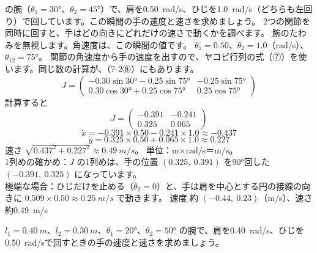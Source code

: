 \begin{phreidai}[関節を回したときの手の速さ]\label{ph:力-7:ex8}
の腕（$\theta_1=\ang{30}$、$\theta_2=\ang{45}$）で、肩を\qty{0.50}{rad/s}、ひじを\qty{1.0}{rad/s}（どちらも左回り）で回しています。この瞬間の手の速度と速さを求めましょう。
\phbamen
2つの関節を同時に回すと、手はどの向きにどれだけの速さで動くかを調べます。
\phmushi
腕のたわみを無視します。角速度は、この瞬間の値です。
\phzu
$\dot\theta_1=0.50$、$\dot\theta_2=1.0$（rad/s）、$\theta_{12}=\ang{75}$。
\phriyu
関節の角速度から手の速度を出すので、ヤコビ行列の式（⑦）を使います。同じ数の計算が、（7-2⑧）にもあります。
\phtateru
\[J=\begin{pmatrix}-0.30\sin\ang{30}-0.25\sin\ang{75}&-0.25\sin\ang{75}\\0.30\cos\ang{30}+0.25\cos\ang{75}&0.25\cos\ang{75}\end{pmatrix}\]
計算すると\[J=\begin{pmatrix}-0.391&-0.241\\0.325&0.065\end{pmatrix}\]
\phtoku
\[\dot x=-0.391\times0.50-0.241\times1.0\approx-0.437\]
\[\dot y=0.325\times0.50+0.065\times1.0\approx0.227\]
速さ $\sqrt{0.437^2+0.227^2}\approx\qty{0.49}{m/s}$。
\phtashikame
単位：m×rad/s＝m/s。\\
1列めの確かめ：$J$ の1列めは、手の位置 $(0.325,\ 0.391)$ を\ang{90}回した $(-0.391,\ 0.325)$ になっています。\\
極端な場合：ひじだけを止める（$\dot\theta_2=0$）と、手は肩を中心とする円の接線の向きに $0.509\times0.50\approx\qty{0.25}{m/s}$ で動きます。
\kotae 速度 約 $(-0.44,\ 0.23)$（m/s）、速さ 約\qty{0.49}{m/s}
\end{phreidai}
\begin{jibun}
$l_1=\qty{0.40}{m}$、$l_2=\qty{0.30}{m}$、$\theta_1=\ang{20}$、$\theta_2=\ang{50}$ の腕で、肩を\qty{0.40}{rad/s}、ひじを\qty{0.50}{rad/s}で回すときの手の速度と速さを求めましょう。
\end{jibun}

